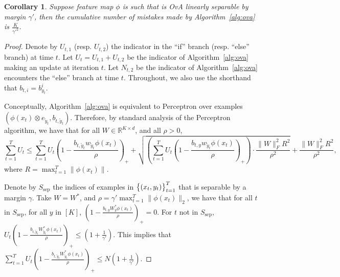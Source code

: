 \documentclass{article}
\DeclareMathOperator*{\sep}{sep}
\newcommand{\field}[1]{\mathbb{#1}}
\newcommand{\fR}{\field{R}}
\newtheorem{corollary}[theorem]{Corollary}
\begin{document}
\begin{corollary}
Suppose feature map $\phi$ is such that  is OvA linearly separable by margin $\gamma'$, then the cumulative number of mistakes made by Algorithm~\ref{alg:ova} is $\frac{K}{\gamma'^2}$.
\end{corollary}

\begin{proof}
Denote by $U_{t,1}$ (resp. $U_{t,2}$) the indicator in the ``if'' branch (resp. ``else'' branch) at time $t$. Let $U_t = U_{t,1} + U_{t,2}$ be the indicator of Algorithm~\ref{alg:ova} making an update at iteration $t$.
Let $N_{t,2}$ be the indicator of Algorithm~\ref{alg:ova} encounters the ``else'' branch at time $t$. Throughout, we also use the shorthand that $b_{t,i} = b_{y_t}^i$.



%

Conceptually, Algorithm~\ref{alg:ova} is equivalent to Perceptron over examples $(\phi(x_t) \otimes e_{\tilde{y}_t}, b_{t, \tilde{y}_t})$.
Therefore, by standard analysis of the Perceptron algorithm, we have that for all $W \in \fR^{K \times d}$, and all $\rho > 0$,
\begin{equation}
\sum_{t=1}^T U_t 
\leq 
\sum_{t=1}^T  U_t (1 - \frac{b_{t,\tilde{y}_t} w_{\tilde{y}_t} \phi(x_t)}{\rho})_+ 
+ \sqrt{(\sum_{t=1}^T  U_t (1 - \frac{b_{t,y} w_{\tilde{y}_t} \phi(x_t)}{\rho})_+) \cdot \frac{\|W\|_F^2 R^2}{\rho^2} } 
+ \frac{\|W\|_F^2 R^2}{\rho^2},
\label{eqn:perceptron-mb}
\end{equation}
where $R = \max_{t=1}^T \| \phi(x_t)\|$.

Denote by $S_{\sep}$ the indices of examples in $\cbr{(x_t, y_t)}_{t=1}^T$ that is separable by a margin $\gamma$.
Take $W = W^*$, and $\rho = \gamma' \max_{t=1}^T \| \phi(x_t) \|_2$, we have that for all $t$ in $S_{\sep}$, for all $y$ in $[K]$, $(1 - \frac{b_{t,y} W^*_y \phi(x_t)}{\rho})_+ = 0$. For $t$ not in $S_{\sep}$,
$U_t (1 - \frac{b_{t,\tilde{y}_t} W^*_{\tilde{y}_t} \phi(x_t)}{\rho})_+ \leq (1 + \frac{1}{\gamma'})$. 
This implies that $\sum_{t=1}^T  U_t (1 - \frac{b_{t,\tilde{y}_t} W^*_{\tilde{y}_t} \phi(x_t)}{\rho})_+ \leq N(1 + \frac 1 {\gamma'})$.


\end{proof}
\end{document}
